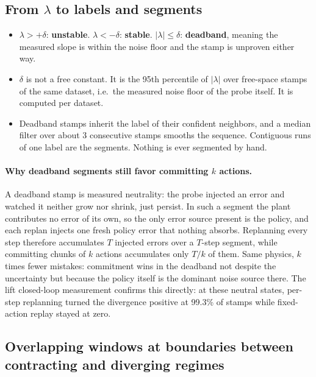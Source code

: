 \documentclass[11pt]{article}
\begin{document}
\subsection{From $\lambda$ to labels and segments}

\begin{itemize}[leftmargin=2em]
  \item $\lambda > +\delta$: \textbf{unstable}. $\lambda < -\delta$: \textbf{stable}.
        $|\lambda| \leq \delta$: \textbf{deadband}, meaning the measured slope is
        within the noise floor and the stamp is unproven either way.
  \item $\delta$ is not a free constant. It is the 95th percentile of $|\lambda|$
        over free-space stamps of the same dataset, i.e.\ the measured noise floor
        of the probe itself. It is computed per dataset.
  \item Deadband stamps inherit the label of their confident neighbors, and a median
        filter over about 3 consecutive stamps smooths the sequence. Contiguous runs
        of one label are the segments. Nothing is ever segmented by hand.
\end{itemize}

\paragraph{Why deadband segments still favor committing $k$ actions.} A deadband
stamp is measured neutrality: the probe injected an error and watched it neither
grow nor shrink, just persist. In such a segment the plant contributes no error of
its own, so the only error source present is the policy, and each replan injects one
fresh policy error that nothing absorbs. Replanning every step therefore accumulates
$T$ injected errors over a $T$-step segment, while committing chunks of $k$ actions
accumulates only $T/k$ of them. Same physics, $k$ times fewer mistakes: commitment
wins in the deadband not despite the uncertainty but because the policy itself is
the dominant noise source there. The lift closed-loop measurement confirms this
directly: at these neutral states, per-step replanning turned the divergence
positive at 99.3\% of stamps while fixed-action replay stayed at zero.

\subsection{Overlapping windows at boundaries between contracting and diverging
regimes}
\end{document}
